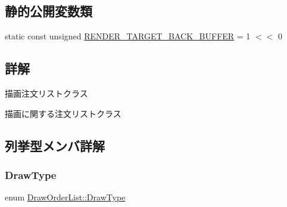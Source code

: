 \subsection*{静的公開変数類}
\begin{DoxyCompactItemize}
\item 
static const unsigned \mbox{\hyperlink{class_draw_order_list_a75498416e70da9517427695271d4b5e7}{R\+E\+N\+D\+E\+R\+\_\+\+T\+A\+R\+G\+E\+T\+\_\+\+B\+A\+C\+K\+\_\+\+B\+U\+F\+F\+ER}} = 1 $<$$<$ 0
\end{DoxyCompactItemize}


\subsection{詳解}
描画注文リストクラス 

描画に関する注文リストクラス 

\subsection{列挙型メンバ詳解}
\mbox{\label{class_draw_order_list_a6c9b9ceb312c16d399ef355f4f3486bb}} 
\subsubsection{\texorpdfstring{Draw\+Type}{DrawType}}
{\footnotesize\ttfamily enum \mbox{\hyperlink{class_draw_order_list_a6c9b9ceb312c16d399ef355f4f3486bb}{Draw\+Order\+List\+::\+Draw\+Type}}}

